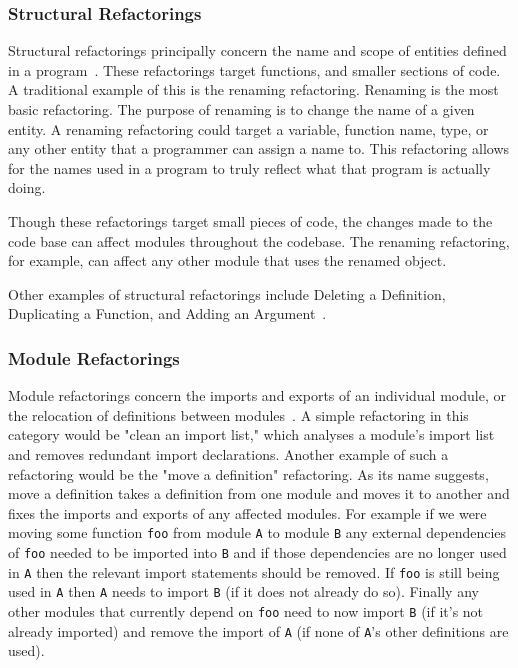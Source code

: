 \subsubsection{Structural Refactorings}

Structural refactorings principally concern the name and scope of entities defined in a program~\citep{huiqingThesis}. These refactorings target functions, and smaller sections of code.  A traditional example of this is the renaming refactoring. Renaming is the most basic refactoring. The purpose of renaming is to change the name of a given entity. A renaming refactoring could target a variable, function name, type, or any other entity that a programmer can assign a name to. This refactoring allows for the names used in a program to truly reflect what that program is actually doing. 

Though these refactorings target small pieces of code, the changes made to the code base can affect modules throughout the codebase. The renaming refactoring, for example, can affect any other module that uses the renamed object.

Other examples of structural refactorings include Deleting a Definition, Duplicating a Function, and Adding an Argument~\citep[p. 15]{huiqingThesis}.

\subsubsection{Module Refactorings}

Module refactorings concern the imports and exports of an individual module, or the relocation of definitions between modules~\citep[p. 20]{huiqingThesis}. A simple refactoring in this category would be "clean an import list," which analyses a module's import list and removes redundant import declarations. Another example of such a refactoring would be the "move a definition" refactoring. As its name suggests, move a definition takes a definition from one module and moves it to another and fixes the imports and exports of any affected modules. For example if we were moving some function \texttt{foo} from module \texttt{A} to module \texttt{B} any external dependencies of \texttt{foo} needed to be imported into \texttt{B} and if those dependencies are no longer used in \texttt{A} then the relevant import statements should be removed. If \texttt{foo} is still being used in \texttt{A} then \texttt{A} needs to import \texttt{B} (if it does not already do so). Finally any other modules that currently depend on \texttt{foo} need to now import \texttt{B} (if it's not already imported) and remove the import of \texttt{A} (if none of \texttt{A}'s other definitions are used).

